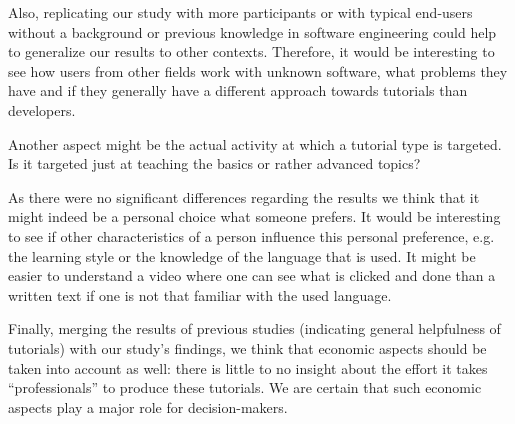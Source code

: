 Also, replicating our study with more participants or with typical end-users without a background or previous knowledge in software engineering could help to generalize our results to other contexts. Therefore, it would be interesting to see how users from other fields work with unknown software, what problems they have and if they generally have a different approach towards tutorials than developers.



Another aspect might be the actual activity at which a tutorial type is targeted. Is it targeted just at teaching the basics or rather advanced topics?


As there were no significant differences regarding the results we think that it might indeed be a personal choice what someone prefers. It would be interesting to see if other characteristics of a person influence this personal preference, e.g. the learning style or the knowledge of the language that is used. It might be easier to understand a video where one can see what is clicked and done than a written text if one is not that familiar with the used language. 

Finally, merging the results of previous studies (indicating general helpfulness of tutorials) with our study's findings, we think that economic aspects should be taken into account as well: there is little to no insight about the effort it takes \enquote{professionals} to produce these tutorials. We are certain that such economic aspects play a major role for decision-makers.


